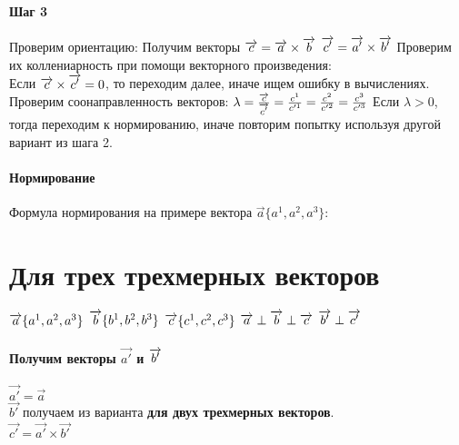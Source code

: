 \documentclass{book}
\begin{document}
\paragraph*{Шаг 3}
Проверим ориентацию:
Получим векторы
$\overrightarrow{c}=\overrightarrow{a}\times\overrightarrow{b}\\$
$\overrightarrow{c'}=\overrightarrow{a'}\times\overrightarrow{b'}\\$
Проверим их коллениарность при помощи векторного произведения:\\
Если $\overrightarrow{c}\times\overrightarrow{c'}=0\\$, то переходим далее, иначе ищем ошибку в вычислениях.\\
Проверим соонаправленность векторов:
$\lambda=\frac{\overrightarrow{c}}{\overrightarrow{c'}}=\frac{c^1}{c'^1}=\frac{c^2}{c'^2}=\frac{c^3}{c'^3}\\$
Если $\lambda > 0$, тогда переходим к нормированию, иначе повторим попытку используя другой вариант из шага 2.\\
\paragraph*{Нормирование}
Формула нормирования на примере вектора $\overrightarrow{a}\{a^1,a^2,a^3\}$:\\
\section{Для трех трехмерных векторов}
$\overrightarrow{a}\{a^1,a^2,a^3\}\\$
$\overrightarrow{b}\{b^1,b^2,b^3\}\\$
$\overrightarrow{c}\{c^1,c^2,c^3\}\\$
$\overrightarrow{a}\perp\overrightarrow{b}\perp\overrightarrow{c}\\$
$\overrightarrow{b'}\perp\overrightarrow{c'}\\$\\
\paragraph*{Получим векторы $\overrightarrow{a'}$ и $\overrightarrow{b'}\\$}
$\overrightarrow{a'}=\overrightarrow{a}$\\
$\overrightarrow{b'}$ получаем из варианта \textbf{для двух трехмерных векторов}.\\
$\overrightarrow{c'}=\overrightarrow{a'}\times\overrightarrow{b'}$
\end{document}
